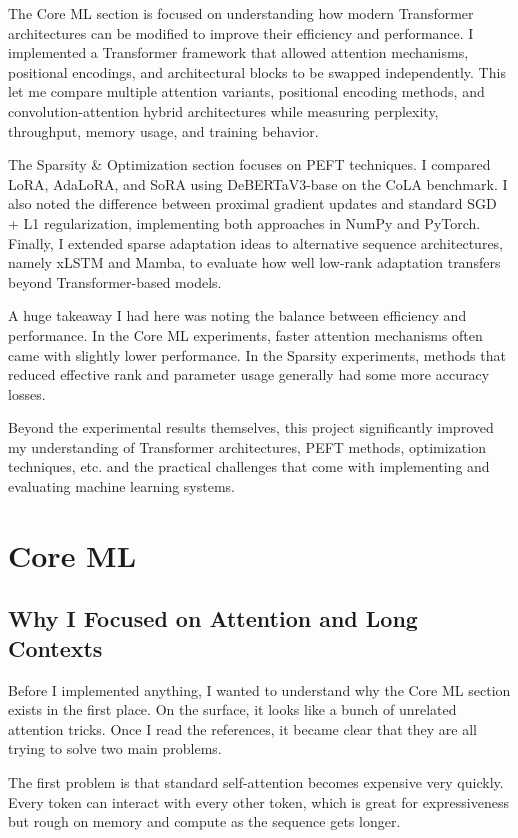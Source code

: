 \documentclass[11pt]{article}
\begin{document}
The Core ML section is focused on understanding how modern Transformer architectures can be modified to improve their efficiency and performance. I implemented a Transformer framework that allowed attention mechanisms, positional encodings, and architectural blocks to be swapped independently. This let me compare multiple attention variants, positional encoding methods, and convolution-attention hybrid architectures while measuring perplexity, throughput, memory usage, and training behavior.

The Sparsity \& Optimization section focuses on PEFT techniques. I compared LoRA, AdaLoRA, and SoRA using DeBERTaV3-base on the CoLA benchmark. I also noted the difference between proximal gradient updates and standard SGD + L1 regularization, implementing both approaches in NumPy and PyTorch. Finally, I extended sparse adaptation ideas to alternative sequence architectures, namely xLSTM and Mamba, to evaluate how well low-rank adaptation transfers beyond Transformer-based models.

A huge takeaway I had here was noting the balance between efficiency and performance. In the Core ML experiments, faster attention mechanisms often came with slightly lower performance. In the Sparsity experiments, methods that reduced effective rank and parameter usage generally had some more accuracy losses.

Beyond the experimental results themselves, this project significantly improved my understanding of Transformer architectures, PEFT methods, optimization techniques, etc. and the practical challenges that come with implementing and evaluating machine learning systems.

\section{Core ML}
\subsection{Why I Focused on Attention and Long Contexts}
Before I implemented anything, I wanted to understand why the Core ML section exists in the first place. On the surface, it looks like a bunch of unrelated attention tricks. Once I read the references, it became clear that they are all trying to solve two main problems.

The first problem is that standard self-attention becomes expensive very quickly. Every token can interact with every other token, which is great for expressiveness but rough on memory and compute as the sequence gets longer.
\end{document}
